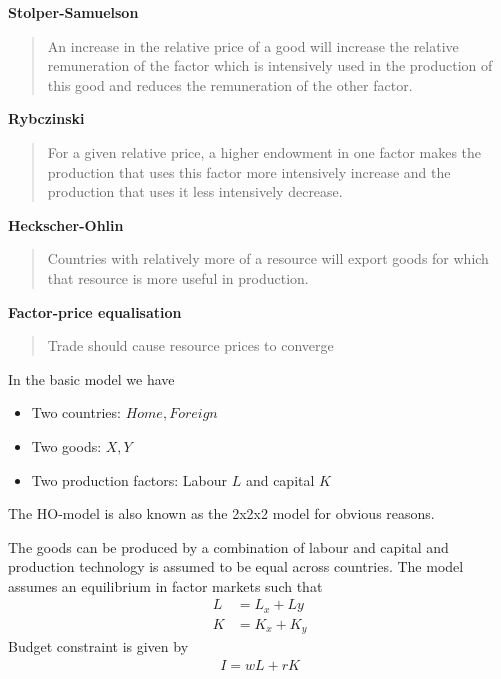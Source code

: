 \documentclass{beamer}
\begin{document}
\begin{frame}
\textbf{Stolper-Samuelson}
\begin{quote}
An increase in the relative price of a good will increase the relative remuneration of the factor which is intensively used in
the production of this good and reduces the remuneration of the other factor.
\end{quote} 
\medskip
\textbf{Rybczinski}
  \begin{quote}
  For a given relative price, a higher endowment in one factor makes the production that uses this factor more intensively increase and the production that uses it less intensively decrease.
  \end{quote}
\end{frame}

\begin{frame}
  \textbf{Heckscher-Ohlin}
 \begin{quote}
 Countries with relatively more of a resource will export goods for which that resource is more useful in production.
 \end{quote} 
  \medskip
  \textbf{Factor-price equalisation}
 \begin{quote}
 Trade should cause resource prices to converge
 \end{quote}
\end{frame}

\begin{frame}
  In the basic model we have   
  \begin{itemize}
    \item Two countries: $Home, Foreign$
    \item Two goods: $X,Y$    
    \item Two production factors: Labour $L$ and capital $K$
  \end{itemize}
  \medskip
  The HO-model is also known as the 2x2x2 model for obvious reasons.
\end{frame}

\begin{frame}
  The goods can be produced by a combination of labour and capital and production technology is assumed to be equal across countries.
  The model assumes an equilibrium in factor markets such that
  \begin{align*}
  L&= L_x+Ly\\
  K&= K_x+K_y
  \end{align*}
  \medskip
  Budget constraint is given by
  \begin{align*}
  I=wL+rK
  \end{align*}
\end{frame}
\end{document}
